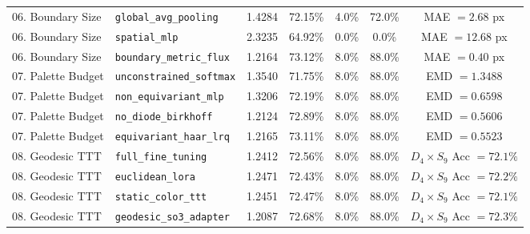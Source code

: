 \begin{table}[t]
\begin{tabular}{llccccc}
06. Boundary Size & \texttt{global\_avg\_pooling} & 1.4284 & 72.15\% & 4.0\% & 72.0\% & MAE $=2.68$ px \\
06. Boundary Size & \texttt{spatial\_mlp} & 2.3235 & 64.92\% & 0.0\% & 0.0\% & MAE $=12.68$ px \\
06. Boundary Size & \texttt{boundary\_metric\_flux} & 1.2164 & 73.12\% & 8.0\% & 88.0\% & MAE $=0.40$ px \\
\midrule
07. Palette Budget & \texttt{unconstrained\_softmax} & 1.3540 & 71.75\% & 8.0\% & 88.0\% & EMD $=1.3488$ \\
07. Palette Budget & \texttt{non\_equivariant\_mlp} & 1.3206 & 72.19\% & 8.0\% & 88.0\% & EMD $=0.6598$ \\
07. Palette Budget & \texttt{no\_diode\_birkhoff} & 1.2124 & 72.89\% & 8.0\% & 88.0\% & EMD $=0.5606$ \\
07. Palette Budget & \texttt{equivariant\_haar\_lrq} & 1.2165 & 73.11\% & 8.0\% & 88.0\% & EMD $=0.5523$ \\
\midrule
08. Geodesic TTT & \texttt{full\_fine\_tuning} & 1.2412 & 72.56\% & 8.0\% & 88.0\% & $D_4\times S_9$ Acc $=72.1\%$ \\
08. Geodesic TTT & \texttt{euclidean\_lora} & 1.2471 & 72.43\% & 8.0\% & 88.0\% & $D_4\times S_9$ Acc $=72.2\%$ \\
08. Geodesic TTT & \texttt{static\_color\_ttt} & 1.2451 & 72.47\% & 8.0\% & 88.0\% & $D_4\times S_9$ Acc $=72.1\%$ \\
08. Geodesic TTT & \texttt{geodesic\_so3\_adapter} & 1.2087 & 72.68\% & 8.0\% & 88.0\% & $D_4\times S_9$ Acc $=72.3\%$ \\
\bottomrule
\end{tabular}
\end{table}
